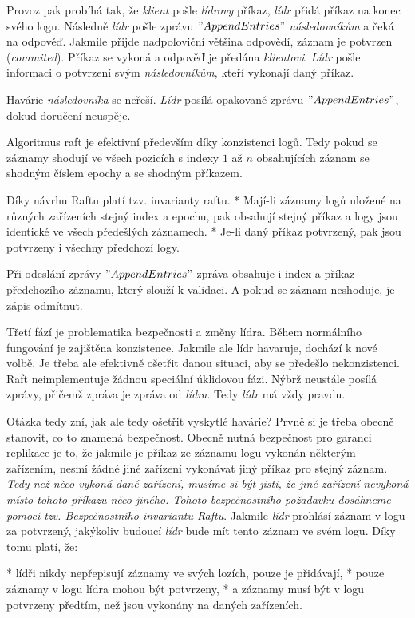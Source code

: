 Provoz pak probíhá tak, že {\em klient} pošle {\em lídrovy} příkaz, {\em lídr} přidá příkaz na konec svého logu. Následně {\em lídr} pošle zprávu $"AppendEntries"$ {\em následovníkům} a čeká na odpověď. Jakmile přijde nadpoloviční většina odpovědí, záznam je potvrzen ({\em commited}). Příkaz se vykoná a odpověď je předána {\em klientovi}. {\em Lídr} pošle informaci o potvrzení svým {\em následovníkům}, kteří vykonají daný příkaz.

Havárie {\em následovníka} se neřeší. {\em Lídr} posílá opakovaně zprávu $"AppendEntries"$, dokud doručení neuspěje.

Algoritmus raft je efektivní především díky konzistenci logů. Tedy pokud se záznamy shodují ve všech pozicích s indexy $1$ až $n$ obsahujících záznam se shodným číslem epochy a se shodným příkazem.

Díky návrhu Raftu platí tzv. {\sbf invarianty raftu}.
\begitems
* Mají-li záznamy logů uložené na různých zařízeních stejný index a epochu, pak obsahují stejný příkaz a logy jsou identické ve všech předešlých záznamech.
* Je-li daný příkaz potvrzený, pak jsou potvrzeny i všechny předchozí logy.
\enditems

Při odeslání zprávy $"AppendEntries"$ zpráva obsahuje i index a příkaz předchozího záznamu, který slouží k validaci. A pokud se záznam neshoduje, je zápis odmítnut.

{\sbf Třetí fází je problematika bezpečnosti a změny lídra}. Během normálního fungování je zajištěna konzistence. Jakmile ale lídr havaruje, dochází k nové volbě. Je třeba ale efektivně ošetřit danou situaci, aby se předešlo nekonzistenci. Raft neimplementuje žádnou speciální úklidovou fázi. Nýbrž neustále posílá zprávy, přičemž zpráva je zpráva od {\em lídra}. Tedy {\em lídr} má vždy pravdu.

Otázka tedy zní, jak ale tedy ošetřit vyskytlé havárie? Prvně si je třeba obecně stanovit, co to znamená {\sbf bezpečnost}. Obecně nutná bezpečnost pro garanci replikace je to, že jakmile je příkaz ze záznamu logu vykonán některým zařízením, nesmí žádné jiné zařízení vykonávat jiný příkaz pro stejný záznam. {\em Tedy než něco vykoná dané zařízení, musíme si být jisti, že jiné zařízení nevykoná místo tohoto příkazu něco jiného. Tohoto bezpečnostního požadavku dosáhneme pomocí tzv. {\sbf Bezpečnostního invariantu Raftu}}. Jakmile {\em lídr} prohlásí záznam v logu za potvrzený, jakýkoliv budoucí {\em lídr} bude mít tento záznam ve svém logu. Díky tomu platí, že:

\begitems
* lídři nikdy nepřepisují záznamy ve svých lozích, pouze je přidávají,
* pouze záznamy v logu lídra mohou být potvrzeny,
* a záznamy musí být v logu potvrzeny předtím, než jsou vykonány na daných zařízeních.
\enditems


